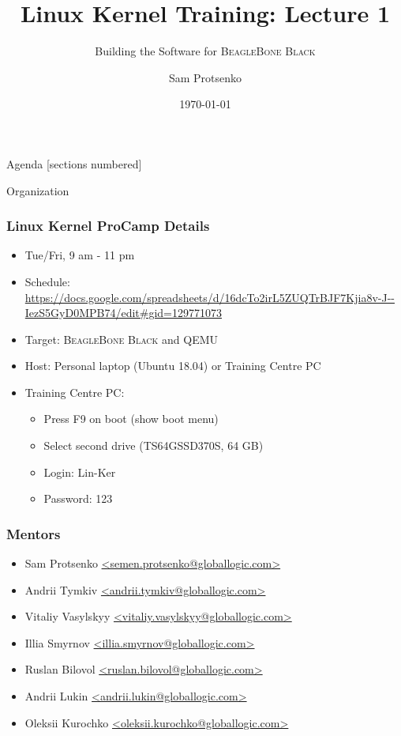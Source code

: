 \documentclass[aspectratio=169]{beamer}
\title{Linux Kernel Training: Lecture 1}
\subtitle{Building the Software for \textsc{BeagleBone Black}}
\date{\today}
\author{Sam Protsenko}
\institute{GlobalLogic}
\begin{document}
\maketitle

\begin{frame}{Agenda}
  [sections numbered]
  \tableofcontents[hideallsubsections]
\end{frame}

\begin{frame}[standout]
  Organization
\end{frame}

\begin{frame}
  \frametitle{Linux Kernel ProCamp Details}
  \begin{itemize}
  \item Tue/Fri, 9 am - 11 pm
  \item Schedule: \url{https://docs.google.com/spreadsheets/d/16dcTo2irL5ZUQTrBJF7Kjia8v-J--IezS5GyD0MPB74/edit\#gid=129771073}
  \item Target: \textsc{BeagleBone Black} and QEMU
  \item Host: Personal laptop (Ubuntu 18.04) or Training Centre PC
  \item Training Centre PC:
    \begin{itemize}
    \item Press F9 on boot (show boot menu)
    \item Select second drive (TS64GSSD370S, 64 GB)
    \item Login: Lin-Ker
    \item Password: 123
    \end{itemize}
  \end{itemize}
\end{frame}

\begin{frame}
  \frametitle{Mentors}
  \begin{itemize}
  \item Sam Protsenko \href{mailto:semen.protsenko@globallogic.com}{<semen.protsenko@globallogic.com>}
  \item Andrii Tymkiv \href{mailto:andrii.tymkiv@globallogic.com}{<andrii.tymkiv@globallogic.com>}
  \item Vitaliy Vasylskyy \href{mailto:vitaliy.vasylskyy@globallogic.com}{<vitaliy.vasylskyy@globallogic.com>}
  \item Illia Smyrnov \href{mailto:illia.smyrnov@globallogic.com}{<illia.smyrnov@globallogic.com>}
  \item Ruslan Bilovol \href{mailto:ruslan.bilovol@globallogic.com}{<ruslan.bilovol@globallogic.com>}
  \item Andrii Lukin \href{mailto:andrii.lukin@globallogic.com}{<andrii.lukin@globallogic.com>}
  \item Oleksii Kurochko \href{mailto:oleksii.kurochko@globallogic.com}{<oleksii.kurochko@globallogic.com>}
  \end{itemize}
\end{frame}
\end{document}
